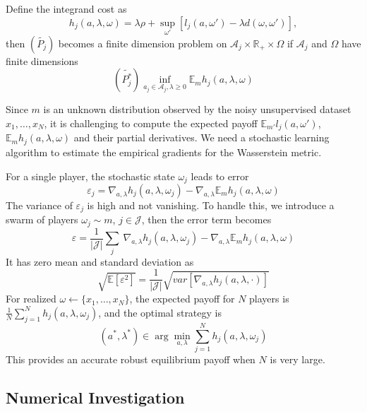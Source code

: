\documentclass{article}
\begin{document}
Define the integrand cost as
\begin{equation}
h_j(a, \lambda, \omega) = \lambda \rho + \sup_{\omega'} [l_j(a,\omega') - \lambda d(\omega,\omega')],
\end{equation}
then $(\tilde{P_j})$ becomes a finite dimension problem on $\mathcal{A}_j \times \mathbb{R}_+ \times \Omega$ if $\mathcal{A}_j$ and $\Omega$ have finite dimensions
\begin{equation}
\label{eq:Pj**}
(\tilde{P_j^*})
\inf_{a_j\in \mathcal{A}_j, \lambda \geq 0} \mathbb{E}_m h_j(a, \lambda, \omega)
\end{equation}

Since $m$ is an unknown distribution observed by the noisy unsupervised dataset $x_1, \ldots, x_N$, it is challenging to compute the expected payoff $\mathbb{E}_{m'}l_j(a,\omega')$, $\mathbb{E}_m h_j(a, \lambda, \omega)$ and their partial derivatives. We need a stochastic learning algorithm to estimate the empirical gradients for the Wasserstein metric.

For a single player, the stochastic state $\omega_j$ leads to error
\begin{equation*}
\varepsilon_j = \nabla_{a,\lambda} h_j(a,\lambda,\omega_{j}) - \nabla_{a,\lambda} \mathbb{E}_m h_j(a,\lambda,\omega)
\end{equation*}
The variance of $\varepsilon_j$ is high and not vanishing. To handle this, we introduce a swarm of players $\omega_j \sim m$, $j \in \mathcal{J}$, then the error term becomes
\begin{equation*}
\varepsilon = \frac{1}{|\mathcal{J}|}\sum_j \ \nabla_{a,\lambda} h_j(a,\lambda,\omega_{j}) - \nabla_{a,\lambda} \mathbb{E}_m h_j(a,\lambda,\omega)
\end{equation*}
It has zero mean and standard deviation as
\begin{equation*}
\sqrt{\mathbb{E}[\varepsilon^2]} = \frac{1}{|\mathcal{J}|}\sqrt{var[\nabla_{a,\lambda}h_j(a,\lambda,\cdot)]}
\end{equation*}
For realized $\omega \leftarrow \{x_1, \ldots, x_N\}$, the expected payoff for $N$ players is
$\frac{1}{N} \sum_{j=1}^{N} h_j(a,\lambda,\omega_j)$,
and the optimal strategy is
$$(a^*, \lambda^*) \in \arg\min_{a,\lambda} \sum_{j=1}^{N} h_j(a,\lambda,\omega_j)$$
This provides an accurate robust equilibrium payoff when $N$ is very large.


\subsection{Numerical Investigation}
\end{document}
